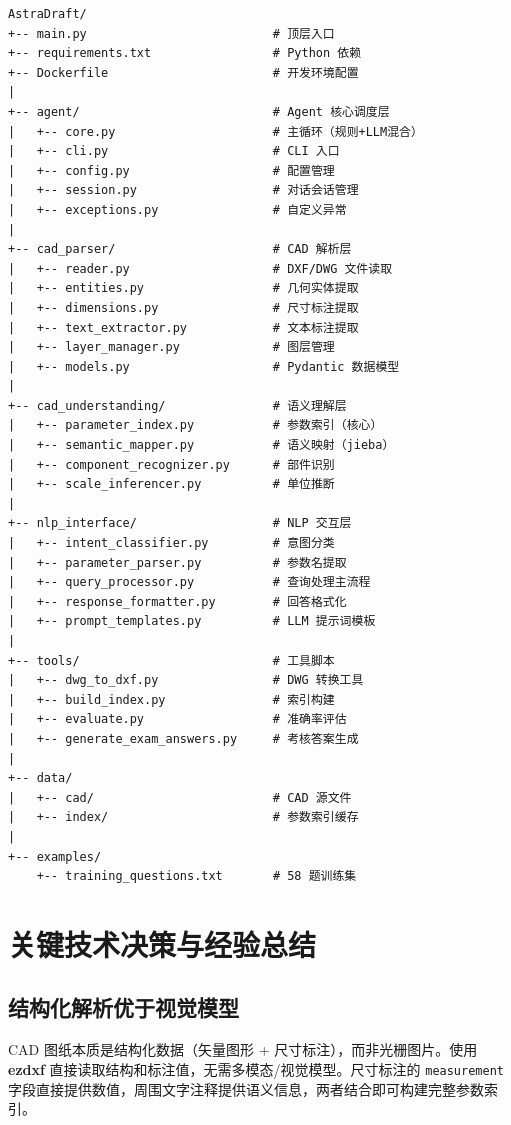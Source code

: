 \documentclass[11pt,a4paper]{article}
\begin{document}
\begin{lstlisting}[language={},frame=single,title=项目完整目录]
AstraDraft/
+-- main.py                          # 顶层入口
+-- requirements.txt                 # Python 依赖
+-- Dockerfile                       # 开发环境配置
|
+-- agent/                           # Agent 核心调度层
|   +-- core.py                      # 主循环（规则+LLM混合）
|   +-- cli.py                       # CLI 入口
|   +-- config.py                    # 配置管理
|   +-- session.py                   # 对话会话管理
|   +-- exceptions.py                # 自定义异常
|
+-- cad_parser/                      # CAD 解析层
|   +-- reader.py                    # DXF/DWG 文件读取
|   +-- entities.py                  # 几何实体提取
|   +-- dimensions.py                # 尺寸标注提取
|   +-- text_extractor.py            # 文本标注提取
|   +-- layer_manager.py             # 图层管理
|   +-- models.py                    # Pydantic 数据模型
|
+-- cad_understanding/               # 语义理解层
|   +-- parameter_index.py           # 参数索引（核心）
|   +-- semantic_mapper.py           # 语义映射（jieba）
|   +-- component_recognizer.py      # 部件识别
|   +-- scale_inferencer.py          # 单位推断
|
+-- nlp_interface/                   # NLP 交互层
|   +-- intent_classifier.py         # 意图分类
|   +-- parameter_parser.py          # 参数名提取
|   +-- query_processor.py           # 查询处理主流程
|   +-- response_formatter.py        # 回答格式化
|   +-- prompt_templates.py          # LLM 提示词模板
|
+-- tools/                           # 工具脚本
|   +-- dwg_to_dxf.py                # DWG 转换工具
|   +-- build_index.py               # 索引构建
|   +-- evaluate.py                  # 准确率评估
|   +-- generate_exam_answers.py     # 考核答案生成
|
+-- data/
|   +-- cad/                         # CAD 源文件
|   +-- index/                       # 参数索引缓存
|
+-- examples/
    +-- training_questions.txt       # 58 题训练集
\end{lstlisting}

\section{关键技术决策与经验总结}

\subsection{结构化解析优于视觉模型}

CAD 图纸本质是结构化数据（矢量图形 + 尺寸标注），而非光栅图片。使用 \textbf{ezdxf} 直接读取结构和标注值，无需多模态/视觉模型。尺寸标注的 \texttt{measurement} 字段直接提供数值，周围文字注释提供语义信息，两者结合即可构建完整参数索引。
\end{document}
